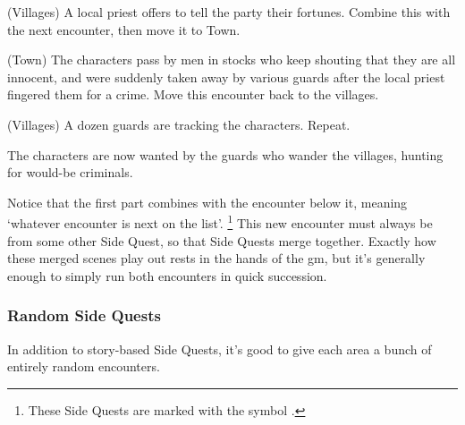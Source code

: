 \begin{multicols}{2}
\begin{list}{\sqn}{}

  \item[\sqr\squash]
  (Villages) A local priest offers to tell the party their fortunes.  Combine this with the next encounter, then move it to Town.

  \item
  (Town) The characters pass by men in stocks who keep shouting that they are all innocent, and were suddenly taken away by various guards after the local priest fingered them for a crime.  Move this encounter back to the villages.

  \item
  (Villages) A dozen guards are tracking the characters. Repeat.

\end{list}

The characters are now wanted by the guards who wander the villages, hunting for would-be criminals.

Notice that the first part combines with the encounter below it, meaning `whatever encounter is next on the list'.%
\footnote{These Side Quests are marked with the symbol \squash.}
This new encounter must always be from some other Side Quest, so that Side Quests merge together.
Exactly how these merged scenes play out rests in the hands of the \gls{gm}, but it's generally enough to simply run both encounters in quick succession.

\subsubsection{Random Side Quests}

In addition to story-based Side Quests, it's good to give each area a bunch of entirely random encounters.

\end{multicols}
